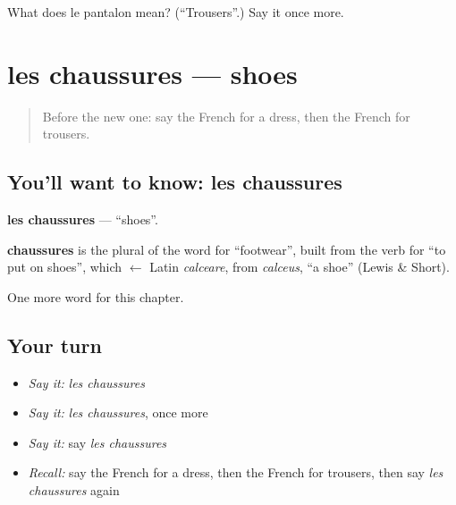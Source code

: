 \begin{tcolorbox}[breakable,colback=teal!4,colframe=teal!35!black,title={Before you move on}]
What does le pantalon mean? (\textquotedblleft{}Trousers\textquotedblright{}.) Say it once more.
\end{tcolorbox}
\section[les chaussures]{les chaussures — shoes}

\label{lesson:FR-C104-chaussures}



\begin{quote}
Before the new one: say the French for a dress, then the French for trousers.
\end{quote}

\subsection*{You'll want to know: les chaussures}
\textbf{les chaussures} — \textquotedblleft{}shoes\textquotedblright{}.

\begin{cousinweb}
\textbf{chaussures} is the plural of the word for \textquotedblleft{}footwear\textquotedblright{}, built from the verb for \textquotedblleft{}to put on shoes\textquotedblright{}, which $\leftarrow$ Latin \emph{calceare}, from \emph{calceus}, \textquotedblleft{}a shoe\textquotedblright{} (Lewis \& Short).
\end{cousinweb}

\begin{grammarlens}[title={What you've built}]
One more word for this chapter.
\end{grammarlens}

\subsection*{Your turn}
\begin{itemize}
\raggedright
  \item \emph{Say it:} \emph{les chaussures}
  \item \emph{Say it:} \emph{les chaussures}, once more
  \item \emph{Say it:} say \emph{les chaussures}
  \item \emph{Recall:} say the French for a dress, then the French for trousers, then say \emph{les chaussures} again
\end{itemize}

